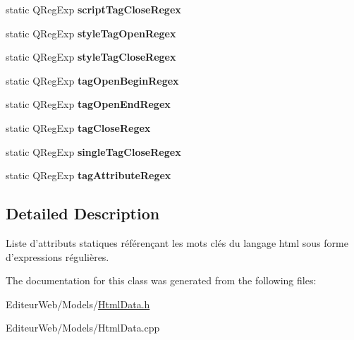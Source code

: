 \begin{DoxyCompactItemize}
\item 
\hypertarget{class_html_data_af540b77e75dba9f8246a9ad6c0169647}{
static QRegExp {\bfseries scriptTagCloseRegex}}
\label{class_html_data_af540b77e75dba9f8246a9ad6c0169647}

\item 
\hypertarget{class_html_data_a9758ec6c3019550d112ddbf233334d91}{
static QRegExp {\bfseries styleTagOpenRegex}}
\label{class_html_data_a9758ec6c3019550d112ddbf233334d91}

\item 
\hypertarget{class_html_data_a37fb59e79be9f907606f00c0a1cf02b5}{
static QRegExp {\bfseries styleTagCloseRegex}}
\label{class_html_data_a37fb59e79be9f907606f00c0a1cf02b5}

\item 
\hypertarget{class_html_data_af43cb0024886be815c9184628d16a1cf}{
static QRegExp {\bfseries tagOpenBeginRegex}}
\label{class_html_data_af43cb0024886be815c9184628d16a1cf}

\item 
\hypertarget{class_html_data_a3e7a2270b34fdb4256c15eb4ab943fef}{
static QRegExp {\bfseries tagOpenEndRegex}}
\label{class_html_data_a3e7a2270b34fdb4256c15eb4ab943fef}

\item 
\hypertarget{class_html_data_a97538067fd320ad5e51b25561a95d824}{
static QRegExp {\bfseries tagCloseRegex}}
\label{class_html_data_a97538067fd320ad5e51b25561a95d824}

\item 
\hypertarget{class_html_data_a64995c41e10d68ce337c49df7c38a6a0}{
static QRegExp {\bfseries singleTagCloseRegex}}
\label{class_html_data_a64995c41e10d68ce337c49df7c38a6a0}

\item 
\hypertarget{class_html_data_a531499948f659c356ee760e6b8680cf8}{
static QRegExp {\bfseries tagAttributeRegex}}
\label{class_html_data_a531499948f659c356ee760e6b8680cf8}

\end{DoxyCompactItemize}


\subsection{Detailed Description}
Liste d'attributs statiques référençant les mots clés du langage html sous forme d'expressions régulières. 

The documentation for this class was generated from the following files:\begin{DoxyCompactItemize}
\item 
EditeurWeb/Models/\hyperlink{_html_data_8h}{HtmlData.h}\item 
EditeurWeb/Models/HtmlData.cpp\end{DoxyCompactItemize}
